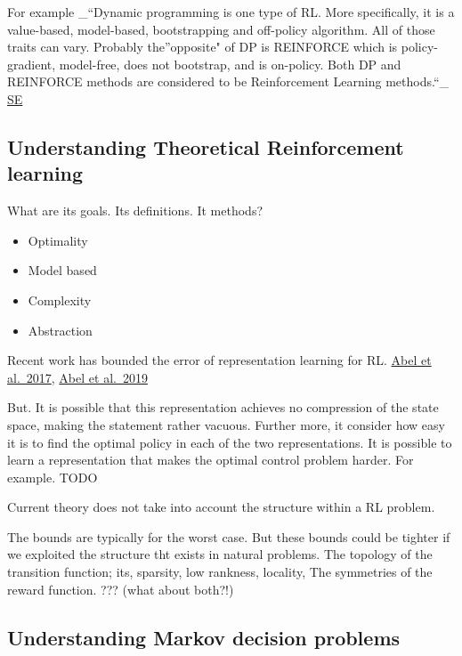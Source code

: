 For example \_``Dynamic programming is one type of RL. More
specifically, it is a value-based, model-based, bootstrapping and
off-policy algorithm. All of those traits can vary. Probably
the''opposite" of DP is REINFORCE which is policy-gradient, model-free,
does not bootstrap, and is on-policy. Both DP and REINFORCE methods are
considered to be Reinforcement Learning methods.``\_
\href{https://datascience.stackexchange.com/questions/38845/what-is-the-relationship-between-mdp-and-rl}{SE}

\hypertarget{understanding-theoretical-reinforcement-learning}{%
\subsection{Understanding Theoretical Reinforcement
learning}\label{understanding-theoretical-reinforcement-learning}}

What are its goals. Its definitions. It methods?

\begin{itemize}
\tightlist
\item
  Optimality
\item
  Model based
\item
  Complexity
\item
  Abstraction
\end{itemize}

Recent work has bounded the error of representation learning for RL.
\href{}{Abel et al.~2017}, \href{}{Abel et al.~2019}

But. It is possible that this representation achieves no compression of
the state space, making the statement rather vacuous. Further more, it
consider how easy it is to find the optimal policy in each of the two
representations. It is possible to learn a representation that makes the
optimal control problem harder. For example. TODO

Current theory does not take into account the structure within a RL
problem.

The bounds are typically for the worst case. But these bounds could be
tighter if we exploited the structure tht exists in natural problems.
The topology of the transition function; its, sparsity, low rankness,
locality, The symmetries of the reward function. ??? (what about both?!)

\hypertarget{understanding-markov-decision-problems}{%
\subsection{Understanding Markov decision
problems}\label{understanding-markov-decision-problems}}


